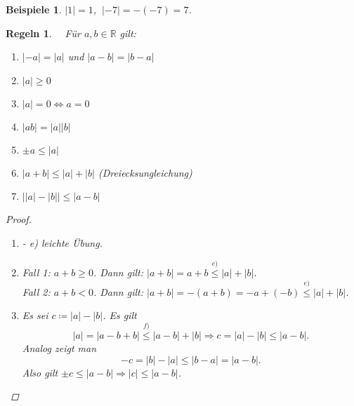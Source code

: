 \documentclass[12pt]{extreport} %
\newcommand{\R}{\mathbb{R}}
\theoremstyle{named}
\theoremstyle{itshape}
\theoremstyle{normal}
\newtheorem*{beispiele}{Beispiele}
\newtheorem*{regeln}{Regeln}
\begin{document}
\begin{beispiele}
	$|1| = 1$, $~|-7| = -(-7) = 7$. 
\end{beispiele}


\begin{regeln} ~\ F\"ur $a,b \in \R$ gilt:
	\begin{enumerate}
	        \item $|-a| = |a|$ und $|a - b| = |b - a|$
		\item $|a| \geq 0$
		\item $|a| = 0 \iff a = 0$
		\item $|ab| = |a||b|$
		\item $\pm a \leq |a|$
		\item $|a + b| \leq |a| + |b|$ (Dreiecksungleichung)
		\item $\left| |a| - |b| \right| \leq |a - b|$
	\end{enumerate}	

	\begin{proof} ~\
	  \begin{enumerate}
		\item[a)]- e) leichte Übung.
		\item[f)] Fall 1: $a +b \geq 0$. Dann gilt: $|a + b| = a + b \overset{e)}{\leq} |a| + |b|$. \\
			Fall 2: $a + b < 0$. Dann gilt: $|a + b| = - (a + b) = - a + (- b) \overset{e)}{\leq} |a| + |b|$.
		\item[g)] Es sei $c \coloneqq |a| - |b|$. Es gilt 
			$$
				|a| = |a - b + b| \overset{f)}{\leq} |a - b | + |b|\Rightarrow c = |a| - |b| \leq |a - b|. 
			$$
			Analog zeigt man
			$$
			         -c = |b| - |a| \leq |b - a| = |a - b|. 
			$$
			Also gilt $\pm c \leq |a - b| \Rightarrow |c| \leq |a-b|$.
	  \end{enumerate}
	\end{proof}
\end{regeln}
\end{document}
